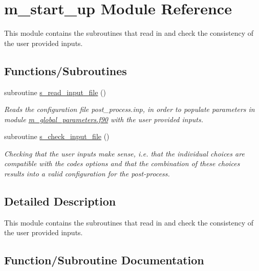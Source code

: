 \hypertarget{namespacem__start__up}{}\section{m\+\_\+start\+\_\+up Module Reference}
\label{namespacem__start__up}


This module contains the subroutines that read in and check the consistency of the user provided inputs.  


\subsection*{Functions/\+Subroutines}
\begin{DoxyCompactItemize}
\item 
subroutine \hyperlink{namespacem__start__up_a3a19eb11ae434dc590a1bd7835442891}{s\+\_\+read\+\_\+input\+\_\+file} ()
\begin{DoxyCompactList}\small\item\em Reads the configuration file post\+\_\+process.\+inp, in order to populate parameters in module \hyperlink{m__global__parameters_8f90}{m\+\_\+global\+\_\+parameters.\+f90} with the user provided inputs. \end{DoxyCompactList}\item 
subroutine \hyperlink{namespacem__start__up_ad77478b402c186b1f620b7d14aab9123}{s\+\_\+check\+\_\+input\+\_\+file} ()
\begin{DoxyCompactList}\small\item\em Checking that the user inputs make sense, i.\+e. that the individual choices are compatible with the code\textquotesingle{}s options and that the combination of these choices results into a valid configuration for the post-\/process. \end{DoxyCompactList}\end{DoxyCompactItemize}


\subsection{Detailed Description}
This module contains the subroutines that read in and check the consistency of the user provided inputs. 

\subsection{Function/\+Subroutine Documentation}
\mbox{\label{namespacem__start__up_ad77478b402c186b1f620b7d14aab9123}} 
